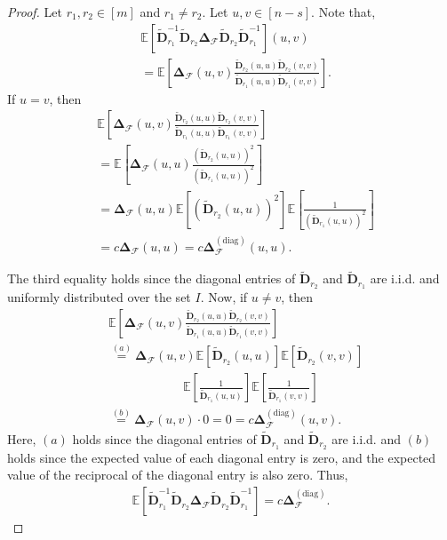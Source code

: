 \documentclass[journal,draftcls,onecolumn]{IEEEtran}
\theoremstyle{mystyle}
\newcommand{\bfD}{\mathbf{D}}
\newcommand{\cF}{\mathcal{F}}
\begin{document}
\begin{proof}


Let $r_1, r_2 \in [m]$ and $r_1 \ne r_2$. Let $u,v \in [n-s]$.  Note that, 
\begin{align*}
&\mathbb{E}[\tilde{\bfD}^{-1}_{r_1}\tilde{\bfD}_{r_2} \mathbf{\Delta}_{\mathcal{F}} \tilde{\bfD}_{r_2} \tilde{\bfD}^{-1}_{r_1}](u,v) \\
&= \mathbb{E}[\mathbf{\Delta}_{\mathcal{F}}(u,v)  \frac{\tilde{\bfD}_{r_2}(u,u)\tilde{\bfD}_{r_2}(v,v)} {\tilde{\bfD}_{r_1}(u,u)\tilde{\bfD}_{r_1}(v,v)}].
\end{align*}
If $u = v$, then 
\begin{align*}
&\mathbb{E}[\mathbf{\Delta}_{\mathcal{F}}(u,v)  \frac{\tilde{\bfD}_{r_2}(u,u)\tilde{\bfD}_{r_2}(v,v)} {\tilde{\bfD}_{r_1}(u,u)\tilde{\bfD}_{r_1}(v,v)}]\\ 
&= \mathbb{E}[\mathbf{\Delta}_{\mathcal{F}}(u,u)  \frac{(\tilde{\bfD}_{r_2}(u,u))^2} {(\tilde{\bfD}_{r_1}(u,u))^2}]\\
&= {\mathbf{\Delta}_{\mathcal{F}}(u,u)}\mathbb{E}[(\tilde{\bfD}_{r_2}(u,u))^2] 
\mathbb{E}\left[\frac{1}{(\tilde{\bfD}_{r_1}(u,u))^2}\right]\\
&= c\mathbf{\Delta}_{\mathcal{F}}(u,u)  = c\mathbf{\Delta}^{(\text{diag})}_{\mathcal{F}}(u,u).
\end{align*}

The third equality holds since the diagonal entries of $\tilde{\bfD}_{r_2}$ and $\tilde{\bfD}_{r_1}$ are i.i.d. and uniformly distributed over the set $I$. Now, if $u \ne v$, then 
\begin{align*}
&\mathbb{E}[\mathbf{\Delta}_{\mathcal{F}}(u,v)  \frac{\tilde{\bfD}_{r_2}(u,u)\tilde{\bfD}_{r_2}(v,v)} {\tilde{\bfD}_{r_1}(u,u)\tilde{\bfD}_{r_1}(v,v)}]\\
& \overset{(a)}= \mathbf{\Delta}_{\mathcal{F}}(u,v)\mathbb{E}[\tilde{\bfD}_{r_2}(u,u)]\mathbb{E}[\tilde{\bfD}_{r_2}(v,v)]\\
& \quad \quad \quad \quad \quad \quad \mathbb{E}\left[\frac{1}{\tilde{\bfD}_{r_1}(u,u)}\right] 
\mathbb{E}\left[\frac{1}{\tilde{\bfD}_{r_1}(v,v)}\right]\\
& \overset{(b)}= \mathbf{\Delta}_{\mathcal{F}}(u,v) \cdot 0 = 0 =c\mathbf{\Delta}^{(\text{diag})}_{\mathcal{F}}(u,v).
\end{align*}
Here, $(a)$ holds since the diagonal entries of $\tilde{\bfD}_{r_1}$ and $\tilde{\bfD}_{r_2}$ are i.i.d. and $(b)$ holds since the expected value of each diagonal entry is zero, and the expected value of the reciprocal of the diagonal entry is also zero. Thus, 
\begin{align*}
\mathbb{E}[\tilde{\bfD}^{-1}_{r_1}\tilde{\bfD}_{r_2} \mathbf{\Delta}_{\cF} \tilde{\bfD}_{r_2} \tilde{\bfD}^{-1}_{r_1}] 
= c\mathbf{\Delta}^{(\text{diag})}_{\mathcal{F}}.
\end{align*}









\end{proof}
\end{document}
